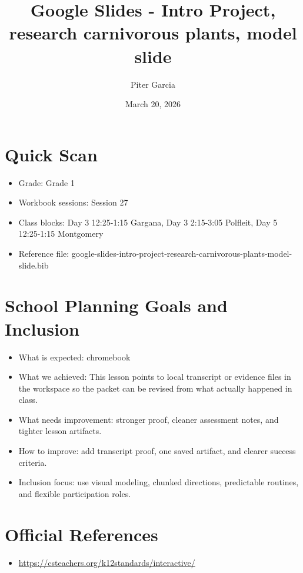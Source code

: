 \documentclass[11pt]{article}
\title{Google Slides - Intro Project, research carnivorous plants, model slide}
\author{Piter Garcia}
\date{March 20, 2026}
\begin{document}
\maketitle
\section*{Quick Scan}
\begin{itemize}[leftmargin=*]
\item Grade: Grade 1
\item Workbook sessions: Session 27
\item Class blocks: Day 3 12:25-1:15 Gargana, Day 3 2:15-3:05 Polfleit, Day 5 12:25-1:15 Montgomery
\item Reference file: google-slides-intro-project-research-carnivorous-plants-model-slide.bib
\end{itemize}
\section*{School Planning Goals and Inclusion}
\begin{itemize}[leftmargin=*]
\item What is expected: chromebook
\item What we achieved: This lesson points to local transcript or evidence files in the workspace so the packet can be revised from what actually happened in class.
\item What needs improvement: stronger proof, cleaner assessment notes, and tighter lesson artifacts.
\item How to improve: add transcript proof, one saved artifact, and clearer success criteria.
\item Inclusion focus: use visual modeling, chunked directions, predictable routines, and flexible participation roles.
\end{itemize}
\section*{Official References}
\begin{itemize}[leftmargin=*]
\item \url{https://csteachers.org/k12standards/interactive/}

\end{itemize}
\end{document}
